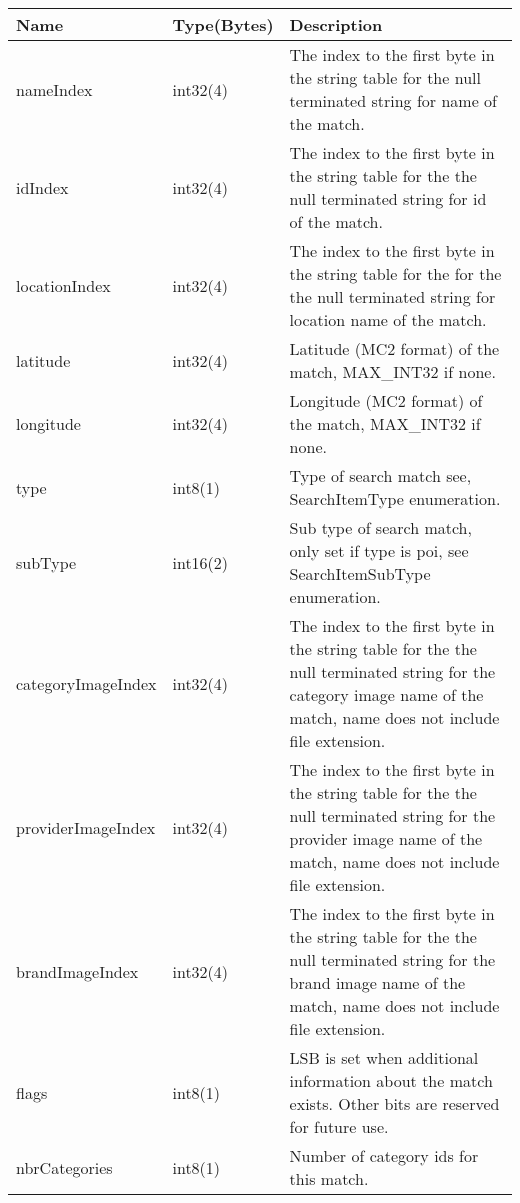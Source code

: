 \documentclass[a4paper]{article}
\begin{document}
\begin{tabular}{|l|l|p{60mm}|}
  \hline
  \textbf{Name} & \textbf{Type(Bytes)} & \textbf{Description} \\\hline
  nameIndex & int32(4)    & The index to the first byte in the string 
                            table for the null terminated string for name
                            of the match. \\\hline
  idIndex   & int32(4)    & The index to the first byte in the string 
                            table for the the null terminated string for id
                            of the match. \\\hline
  locationIndex & int32(4)& The index to the first byte in the string 
                            table for the for the the null terminated string 
                            for location name of the match. \\\hline
  latitude  & int32(4)    & Latitude (MC2 format) of the match, MAX\_INT32 if none. \\\hline
  longitude & int32(4)    & Longitude (MC2 format) of the match, MAX\_INT32 if none.\\\hline
  type      & int8(1)     & Type of search match see, SearchItemType 
                            enumeration. \\\hline
  subType   & int16(2)    & Sub type of search match, only set if type is poi, 
                            see SearchItemSubType enumeration. \\\hline
  categoryImageIndex & int32(4) & The index to the first byte in the string 
                            table for the the null terminated string for the 
                            category image name of the match, 
                            name does not include file extension. \\\hline
  providerImageIndex & int32(4) & The index to the first byte in the string 
                            table for the the null terminated string for the
                            provider image name of the match, 
                            name does not include file extension. \\\hline
  brandImageIndex & int32(4) & The index to the first byte in the string 
                            table for the the null terminated string for the
                            brand image name of the match, 
                            name does not include file extension. \\\hline
  flags & int8(1)  & LSB is set when additional information about the match exists.
  Other bits are reserved for future use. \\\hline
  nbrCategories & int8(1) & Number of category ids for this match. \\\hline
\end{tabular}
\end{document}
